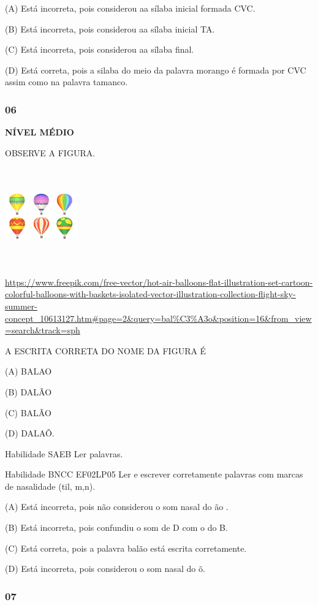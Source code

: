 (A) Está incorreta, pois considerou aa sílaba inicial formada CVC.

(B) Está incorreta, pois considerou aa sílaba inicial TA.

(C) Está incorreta, pois considerou aa sílaba final.

(D) Está correta, pois a silaba do meio da palavra morango é formada por
CVC assim como na palavra tamanco.

\subsubsection{06}\label{section-132}

\textbf{NÍVEL MÉDIO}

OBSERVE A FIGURA.

\includegraphics[width=1.22569in,height=1.65417in]{media/image167.jpeg}

\url{https://www.freepik.com/free-vector/hot-air-balloons-flat-illustration-set-cartoon-colorful-balloons-with-baskets-isolated-vector-illustration-collection-flight-sky-summer-concept_10613127.htm\#page=2\&query=bal\%C3\%A3o\&position=16\&from_view=search\&track=sph}

A ESCRITA CORRETA DO NOME DA FIGURA É

(A) BALAO

(B) DALÃO

(C) BALÃO

(D) DALAÕ.

Habilidade SAEB Ler palavras.

Habilidade BNCC EF02LP05 Ler e escrever corretamente palavras com marcas
de nasalidade (til, m,n).

(A) Está incorreta, pois não considerou o som nasal do ão .

(B) Está incorreta, pois confundiu o som de D com o do B.

(C) Está correta, pois a palavra balão está escrita corretamente.

(D) Está incorreta, pois considerou o som nasal do õ.

\subsubsection{07 }\label{section-133}

